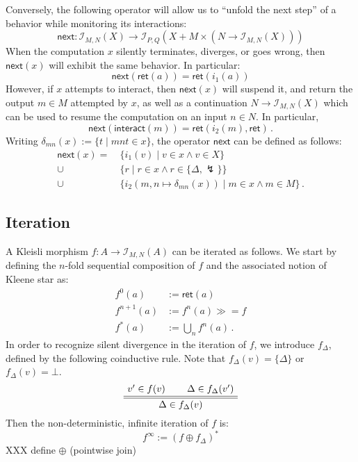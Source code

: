 \documentclass{article}
\newcommand{\kw}[1]{\ensuremath{ \mathsf{#1} }}
\newcommand{\bind}{\gg\!\!=}
\begin{document}
Conversely,
the following operator
will allow us to ``unfold the next step'' of a behavior
while monitoring its interactions:
\[
    \kw{next} :
       \mathcal{I}_{M,N}(X) \rightarrow
       \mathcal{I}_{P,Q}(X + M \times (N \rightarrow \mathcal{I}_{M,N}(X)))
\]
When the computation $x$ silently terminates, diverges, or goes wrong,
then $\kw{next}(x)$ will exhibit the same behavior.
In particular:
\[
    \kw{next}(\kw{ret}(a)) = \kw{ret}(i_1(a))
\]
However,
if $x$ attempts to interact,
then $\kw{next}(x)$ will suspend it,
and return the output $m \in M$ attempted by $x$,
as well as a continuation $N \rightarrow \mathcal{I}_{M,N}(X)$
which can be used to resume the computation
on an input $n \in N$.
In particular,
\[
    \kw{next}(\kw{interact}(m)) = \kw{ret}(i_2(m), \kw{ret}) \,.
\]
Writing $\delta_{mn}(x) := \{ t \mid mnt \in x \}$,
the operator $\kw{next}$ can be defined as follows:
\begin{align*}
    \kw{next}(x) = \: & \{ i_1(v) \mid v \in x \wedge v \in X \} \\
              \cup \: & \{ r \mid r \in x \wedge r \in \{\Delta,\lightning\} \} \\
              \cup \: & \{ i_2(m, n \mapsto \delta_{mn}(x)) \mid m \in x \wedge m \in M \} \,.
\end{align*}


\subsection{Iteration} \label{sec:monad:iter} %

A Kleisli morphism $f : A \rightarrow \mathcal{I}_{M,N}(A)$
can be iterated as follows.
We start by defining
the $n$-fold sequential composition of $f$
and the associated notion of Kleene star as:
\begin{align*}
    f^0(a) &:= \kw{ret}(a) \\
    f^{n+1}(a) &:= f^n(a) \bind f \\
    f^*(a) &:= \bigcup_n f^n(a) \,.
\end{align*}
In order to recognize silent divergence in the iteration of $f$,
we introduce $f_\Delta$,
defined by the following coinductive rule.
Note that $f_\Delta(v) = \{\Delta\}$ or $f_\Delta(v) = \bot$.
\[
    \AxiomC{$v' \in f(v)$}
    \AxiomC{$\Delta \in f_\Delta(v')$}
    \doubleLine
    \BinaryInfC{$\Delta \in f_\Delta(v)$}
    \DisplayProof
\]
Then the non-deterministic, infinite iteration of $f$ is:
\[
    f^\infty := (f \oplus f_\Delta)^*
\]
XXX define $\oplus$ (pointwise join)
\end{document}
